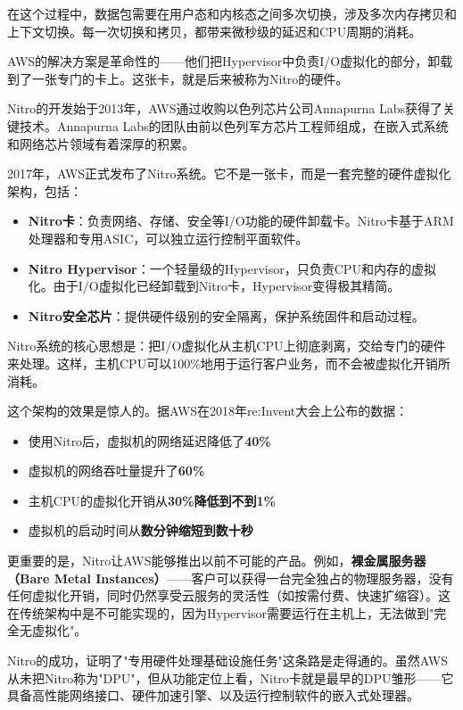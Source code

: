 在这个过程中，数据包需要在用户态和内核态之间多次切换，涉及多次内存拷贝和上下文切换。每一次切换和拷贝，都带来微秒级的延迟和CPU周期的消耗。

AWS的解决方案是革命性的——他们把Hypervisor中负责I/O虚拟化的部分，卸载到了一张专门的卡上。这张卡，就是后来被称为Nitro的硬件。

Nitro的开发始于2013年，AWS通过收购以色列芯片公司Annapurna Labs获得了关键技术。Annapurna Labs的团队由前以色列军方芯片工程师组成，在嵌入式系统和网络芯片领域有着深厚的积累。

2017年，AWS正式发布了Nitro系统。它不是一张卡，而是一套完整的硬件虚拟化架构，包括：

\begin{itemize}
    \item \textbf{Nitro卡}：负责网络、存储、安全等I/O功能的硬件卸载卡。Nitro卡基于ARM处理器和专用ASIC，可以独立运行控制平面软件。
    \item \textbf{Nitro Hypervisor}：一个轻量级的Hypervisor，只负责CPU和内存的虚拟化。由于I/O虚拟化已经卸载到Nitro卡，Hypervisor变得极其精简。
    \item \textbf{Nitro安全芯片}：提供硬件级别的安全隔离，保护系统固件和启动过程。
\end{itemize}

Nitro系统的核心思想是：把I/O虚拟化从主机CPU上彻底剥离，交给专门的硬件来处理。这样，主机CPU可以100\%地用于运行客户业务，而不会被虚拟化开销所消耗。

这个架构的效果是惊人的。据AWS在2018年re:Invent大会上公布的数据：

\begin{itemize}
    \item 使用Nitro后，虚拟机的网络延迟降低了\textbf{40\%}
    \item 虚拟机的网络吞吐量提升了\textbf{60\%}
    \item 主机CPU的虚拟化开销从\textbf{30\%降低到不到1\%}
    \item 虚拟机的启动时间从\textbf{数分钟缩短到数十秒}
\end{itemize}

更重要的是，Nitro让AWS能够推出以前不可能的产品。例如，\textbf{裸金属服务器（Bare Metal Instances）}——客户可以获得一台完全独占的物理服务器，没有任何虚拟化开销，同时仍然享受云服务的灵活性（如按需付费、快速扩缩容）。这在传统架构中是不可能实现的，因为Hypervisor需要运行在主机上，无法做到"完全无虚拟化"。

Nitro的成功，证明了"专用硬件处理基础设施任务"这条路是走得通的。虽然AWS从未把Nitro称为"DPU"，但从功能定位上看，Nitro卡就是最早的DPU雏形——它具备高性能网络接口、硬件加速引擎、以及运行控制软件的嵌入式处理器。

